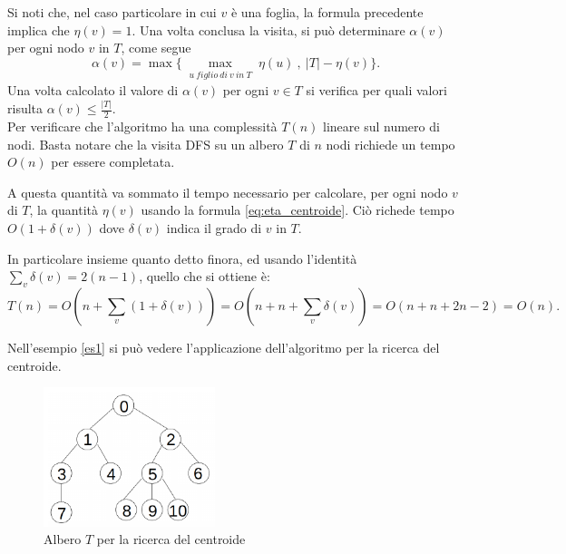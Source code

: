 Si noti che, nel caso particolare in cui $v$ è una foglia, la formula precedente implica che $\eta(v)=1$.
Una volta conclusa la visita, si pu\`o determinare $ \alpha(v) $ per ogni nodo $ v $ in $ T $, come segue
\[ \alpha(v) = \max\{ \max_{\substack{u \ figlio \ di \ v \ in \ T}} {\eta(u)} \ , \ |T| - \eta(v) \}. \]
\noindent Una volta calcolato il valore di $ \alpha(v) $ per ogni $  v \in T $ si verifica per quali valori  risulta $\alpha(v)\le\frac{|T|}{2}$.\\
Per verificare che l'algoritmo ha una complessit\`a $ T(n) $ lineare sul numero di nodi.
Basta notare che la visita DFS su un albero $ T $ di $ n $ nodi richiede un tempo $ O(n) $ per essere completata.

A questa quantità va sommato il tempo necessario per calcolare, per ogni nodo $v$ di $T$, la quantità $\eta(v)$ usando la formula \eqref{eq:eta_centroide}. Ciò richede tempo $O(1 + \delta(v))$ dove $\delta(v)$ indica il grado di $v$ in $T$.

In particolare insieme quanto detto finora, ed usando l'identità $\sum_{v} \delta(v) = 2(n-1)$, quello che si ottiene \`e:
\[  T(n) = O(n + \sum_{v}(1+\delta(v)))= O(n + n + \sum_{v}\delta(v)) = O(n+n+2n-2)=O(n).
\] 

Nell'esempio \ref{es1} si pu\`o vedere l'applicazione dell'algoritmo per la ricerca del centroide.
	\begin{figure}[htbp]
		\centering
		\includegraphics[width=5cm]{capitolo3/grafo2}
		\caption{Albero $ T $  per la ricerca del centroide} 
		\label{fig:2}
\end{figure}

